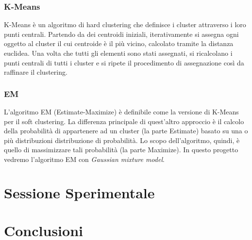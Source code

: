 \documentclass{llncs}
\begin{document}
	\subsubsection{K-Means}
	K-Means è un algoritmo di hard clustering che definisce i cluster attraverso i loro punti centrali.
	Partendo da dei centroidi iniziali, iterativamente si assegna ogni oggetto al cluster il cui centroide è
	il più vicino, calcolato tramite la distanza euclidea. Una volta che tutti gli elementi sono stati assegnati, si ricalcolano i punti centrali di tutti
	i cluster e si ripete il procedimento di assegnazione così da raffinare il clustering.

	\subsubsection{EM}
	L'algoritmo EM (Estimate-Maximize) è definibile come la versione di K-Means per il soft clustering.
	La differenza principale di quest'altro approccio è il calcolo della probabilità di appartenere ad un cluster (la parte Estimate)
	basato su una o più distribuzioni distribuzione di probabilità. Lo scopo dell'algoritmo, quindi, è quello di massimizzare
	tali probabilità (la parte Maximize). In questo progetto vedremo l'algoritmo EM con \textit{Gaussian mixture model}.


    \section{Sessione Sperimentale}
    \section{Conclusioni}
    
\end{document}
